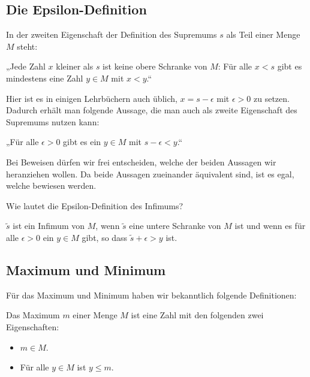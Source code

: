 \documentclass[fontsize=9pt,
               parskip=half-,
               DIV=14,
               listof=chapterentry,
               tocflat]{scrbook}
\begin{document}
\subsection{Die Epsilon-Definition}

In der zweiten Eigenschaft der Definition des Supremums $s$ als Teil einer Menge $M$ steht:

\begin{importantparagraph*}
„Jede Zahl $x$ kleiner als $s$ ist keine obere Schranke von $M$: Für alle $x<s$ gibt es mindestens eine Zahl $y\in M$ mit $x<y$.“

\end{importantparagraph*}

Hier ist es in einigen Lehrbüchern auch üblich, $x=s-\epsilon $ mit $\epsilon >0$ zu setzen. Dadurch erhält man folgende Aussage, die man auch als zweite Eigenschaft des Supremums nutzen kann:

\begin{importantparagraph*}
„Für alle $\epsilon >0$ gibt es ein $y\in M$ mit $s-\epsilon <y$.“

\end{importantparagraph*}

Bei Beweisen dürfen wir frei entscheiden, welche der beiden Aussagen wir heranziehen wollen. Da beide Aussagen zueinander äquivalent sind, ist es egal, welche bewiesen werden.

\begin{mdframed}[style=semanticbox,frametitleaboveskip=3pt,innerbottommargin=3pt,frametitle=Frage]
Wie lautet die Epsilon-Definition des Infimums?

\end{mdframed}

\begin{answer*}
${\tilde {s}}$ ist ein Infimum von $M$, wenn ${\tilde {s}}$ eine untere Schranke von $M$ ist und wenn es für alle $\epsilon >0$ ein $y\in M$ gibt, so dass ${\tilde {s}}+\epsilon >y$ ist.

\end{answer*}

\subsection{Maximum und Minimum}

Für das Maximum und Minimum haben wir bekanntlich folgende Definitionen:

\begin{definition*}[Maximum]
Das Maximum $m$ einer Menge $M$ ist eine Zahl mit den folgenden zwei Eigenschaften:

\begin{itemize}
\item $m\in M$.
\item Für alle $y\in M$ ist $y\leq m$.
\end{itemize}

\end{definition*}
\end{document}

